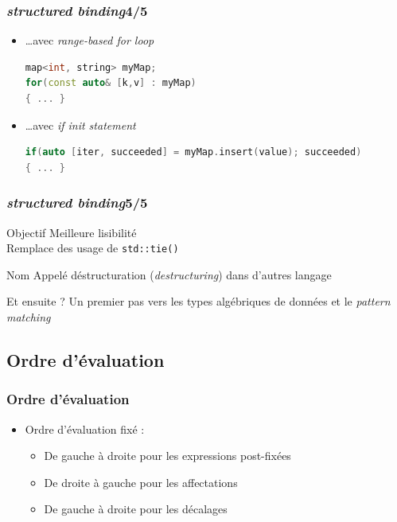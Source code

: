 \documentclass[C++.tex]{subfiles}
\begin{document}
\begin{frame}[fragile]
	\frametitle{\textit{structured binding}\titlehfill{}4/5}
	\begin{itemize}
		\item \ldots{}avec \textit{range-based for loop}

		\begin{lstlisting}[language=C++]
map<int, string> myMap;    
for(const auto& [k,v] : myMap) 
{ ... } \end{lstlisting}

		\item \ldots{}avec \textit{if init statement}

		\begin{lstlisting}[language=C++]
if(auto [iter, succeeded] = myMap.insert(value); succeeded)
{ ... }\end{lstlisting}
	\end{itemize}
\end{frame}

\begin{frame}[fragile]
	\frametitle{\textit{structured binding}\titlehfill{}5/5}
	\begin{block}{Objectif}
		Meilleure lisibilité\\
		Remplace des usage de \lstinline|std::tie()|
	\end{block}

	\begin{block}{Nom}
		Appelé déstructuration (\textit{destructuring}) dans d'autres langage
	\end{block}

	\begin{block}{Et ensuite ?}
		Un premier pas vers les types algébriques de données et le \textit{pattern matching}
	\end{block}

\end{frame}

\subsection*{Ordre d'évaluation}
\begin{frame}[fragile]
	\frametitle{Ordre d'évaluation}
	\begin{itemize}
		\item Ordre d'évaluation fixé :
		\begin{itemize}
			\item De gauche à droite pour les expressions post-fixées


			\item De droite à gauche pour les affectations
			\item De gauche à droite pour les décalages
		\end{itemize}
	\end{itemize}
\end{frame}
\end{document}
